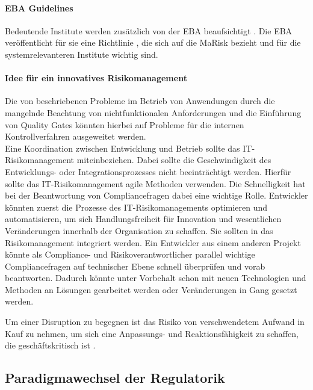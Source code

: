 \paragraph{EBA Guidelines}
Bedeutende Institute werden zusätzlich von der \ac{EBA} beaufsichtigt \cite{recht/Bornemann2018}. Die \ac{EBA} veröffentlicht für sie eine Richtlinie \cite{eba:2019}, die sich auf die \ac{MaRisk} bezieht und für die systemrelevanteren Institute wichtig sind.

\paragraph{Idee für ein innovatives Risikomanagement}
Die von \citet{mci/Disterer2011} beschriebenen Probleme im Betrieb von Anwendungen durch die mangelnde Beachtung von nichtfunktionalen Anforderungen und die Einführung von Quality Gates könnten hierbei auf Probleme für die internen Kontrollverfahren ausgeweitet werden. 
\medskip
\\
Eine Koordination zwischen Entwicklung und Betrieb sollte das IT-Risikomanagement miteinbeziehen. Dabei sollte die Geschwindigkeit des Entwicklungs- oder Integrationsprozesses nicht beeinträchtigt werden. Hierfür sollte das IT-Risikomanagement agile Methoden verwenden. Die Schnelligkeit hat bei der Beantwortung von Compliancefragen dabei eine wichtige Rolle. Entwickler könnten zuerst die Prozesse des IT-Risikomanagements optimieren und automatisieren, um sich Handlungsfreiheit für Innovation und wesentlichen Veränderungen innerhalb der Organisation zu schaffen. Sie sollten in das Risikomanagement integriert werden. Ein Entwickler aus einem anderen Projekt könnte als Compliance- und Risikoverantwortlicher parallel wichtige Compliancefragen auf technischer Ebene schnell überprüfen und vorab beantworten. Dadurch könnte unter Vorbehalt schon mit neuen Technologien und Methoden an Lösungen gearbeitet werden oder Veränderungen in Gang gesetzt werden. 

Um einer Disruption zu begegnen ist das Risiko von verschwendetem Aufwand in Kauf zu nehmen, um sich eine Anpassungs- und Reaktionsfähigkeit zu schaffen, die geschäftskritisch ist \cite{Bussmann2006}.

\subsection{Paradigmawechsel der Regulatorik}

